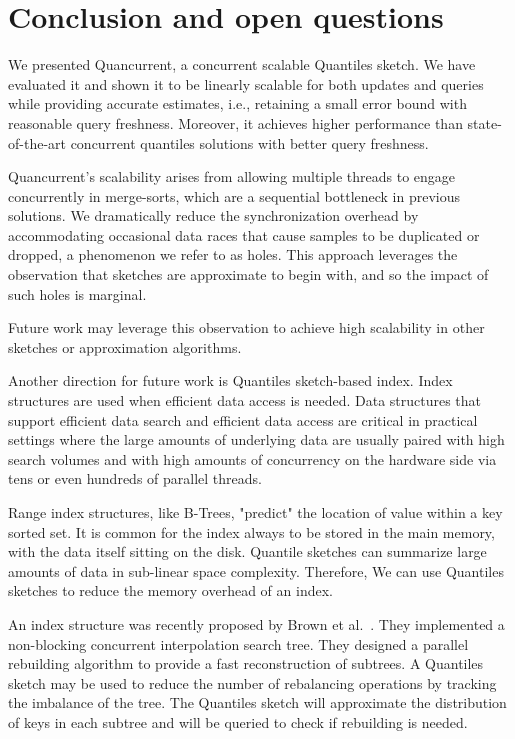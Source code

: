 \chapter{Conclusion and open questions}
\label{chap:conclusion}



We presented Quancurrent, a concurrent scalable Quantiles sketch. We have evaluated it and shown it to be linearly scalable for both updates and queries while providing accurate estimates, i.e., retaining a small error bound with reasonable query freshness. Moreover, it achieves higher performance than state-of-the-art concurrent quantiles solutions with better query freshness.

Quancurrent's scalability arises from allowing multiple threads to engage concurrently in merge-sorts, which are a sequential bottleneck in previous solutions. We dramatically reduce the synchronization overhead by accommodating occasional data races that cause samples to be duplicated or dropped, a phenomenon we refer to as holes. This approach leverages the observation that sketches are approximate to begin with, and so the impact of such holes is marginal.

Future work may leverage this observation to achieve high scalability in other sketches or approximation algorithms.

Another direction for future work is Quantiles sketch-based index. Index structures are used when efficient data access is needed. Data structures that support efficient data search and efficient data access are critical in practical settings where the large amounts of underlying data are usually paired with high search volumes and with high amounts of concurrency on the hardware side via tens or even hundreds of parallel threads. 

Range index structures, like B-Trees, "predict" the location of value within a key sorted set. It is common for the index always to be stored in the main memory, with the data itself sitting on the disk. Quantile sketches can summarize large amounts of data in sub-linear space complexity. Therefore, We can use Quantiles sketches to reduce the memory overhead of an index. 

An index structure was recently proposed by Brown et al.~\cite{cist}. They implemented a non-blocking concurrent interpolation search tree. They designed a parallel rebuilding algorithm to provide a fast reconstruction of subtrees. A Quantiles sketch may be used to reduce the number of rebalancing operations by tracking the imbalance of the tree. The Quantiles sketch will approximate the distribution of keys in each subtree and will be queried to check if rebuilding is needed. 

